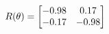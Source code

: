 \documentclass[preview]{standalone}
\begin{document}
\begin{align*}
\special{dvisvgm:raw <g id='unique000'>}R(\theta) = \begin{bmatrix}-0.98 & 0.17\\-0.17 & -0.98\end{bmatrix}\special{dvisvgm:raw </g>}
\end{align*}
\end{document}

